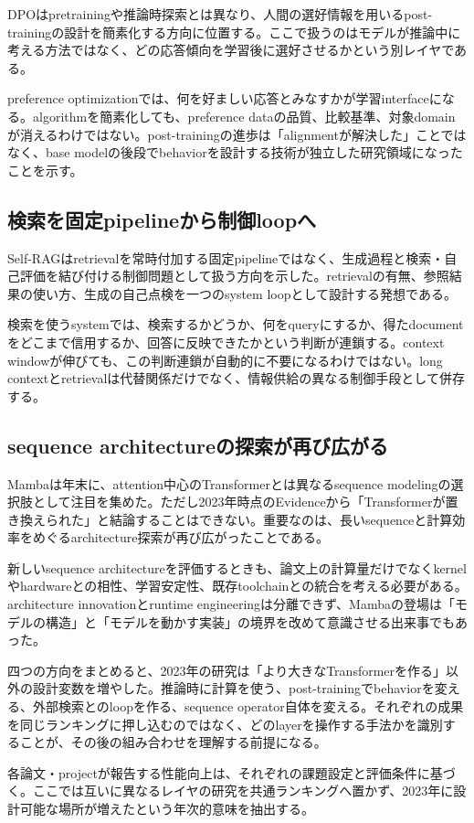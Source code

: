 DPOはpretrainingや推論時探索とは異なり、人間の選好情報を用いるpost-trainingの設計を簡素化する方向に位置する。ここで扱うのはモデルが推論中に考える方法ではなく、どの応答傾向を学習後に選好させるかという別レイヤである。\autocite{src-21aef0026892}


preference optimizationでは、何を好ましい応答とみなすかが学習interfaceになる。algorithmを簡素化しても、preference dataの品質、比較基準、対象domainが消えるわけではない。post-trainingの進歩は「alignmentが解決した」ことではなく、base modelの後段でbehaviorを設計する技術が独立した研究領域になったことを示す。\autocite{src-21aef0026892}


\subsection{検索を固定pipelineから制御loopへ}

Self-RAGはretrievalを常時付加する固定pipelineではなく、生成過程と検索・自己評価を結び付ける制御問題として扱う方向を示した。retrievalの有無、参照結果の使い方、生成の自己点検を一つのsystem loopとして設計する発想である。\autocite{src-e413c7ab8da4}


検索を使うsystemでは、検索するかどうか、何をqueryにするか、得たdocumentをどこまで信用するか、回答に反映できたかという判断が連鎖する。context windowが伸びても、この判断連鎖が自動的に不要になるわけではない。long contextとretrievalは代替関係だけでなく、情報供給の異なる制御手段として併存する。\autocite{src-e413c7ab8da4}


\subsection{sequence architectureの探索が再び広がる}

Mambaは年末に、attention中心のTransformerとは異なるsequence modelingの選択肢として注目を集めた。ただし2023年時点のEvidenceから「Transformerが置き換えられた」と結論することはできない。重要なのは、長いsequenceと計算効率をめぐるarchitecture探索が再び広がったことである。\autocite{src-5dd64e15cc75}


新しいsequence architectureを評価するときも、論文上の計算量だけでなくkernelやhardwareとの相性、学習安定性、既存toolchainとの統合を考える必要がある。architecture innovationとruntime engineeringは分離できず、Mambaの登場は「モデルの構造」と「モデルを動かす実装」の境界を改めて意識させる出来事でもあった。\autocite{src-5dd64e15cc75}


四つの方向をまとめると、2023年の研究は「より大きなTransformerを作る」以外の設計変数を増やした。推論時に計算を使う、post-trainingでbehaviorを変える、外部検索とのloopを作る、sequence operator自体を変える。それぞれの成果を同じランキングに押し込むのではなく、どのlayerを操作する手法かを識別することが、その後の組み合わせを理解する前提になる。\autocite{src-21aef0026892,src-5dd64e15cc75,src-8a38211129c4,src-e413c7ab8da4}


\begin{claimboundary}
各論文・projectが報告する性能向上は、それぞれの課題設定と評価条件に基づく。ここでは互いに異なるレイヤの研究を共通ランキングへ置かず、2023年に設計可能な場所が増えたという年次的意味を抽出する。\autocite{src-8a38211129c4}
\end{claimboundary}
